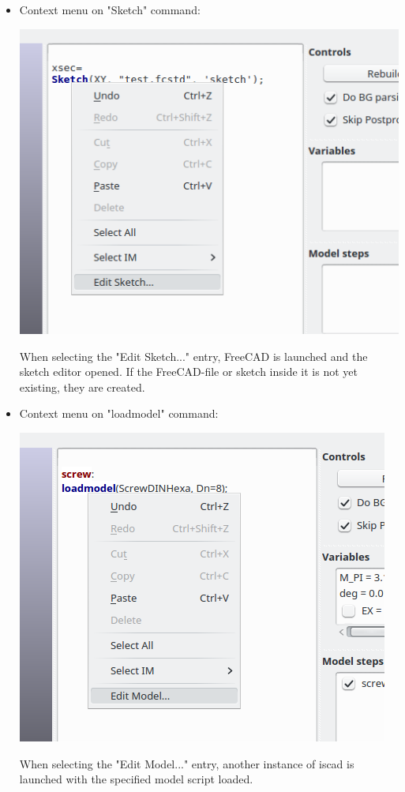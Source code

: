 \begin{itemize}
\item Context menu on "Sketch" command:

    \includegraphics[width=\linewidth]{figs/iscad/screenshot_iscad_context_sketch}
    
    When selecting the "Edit Sketch..." entry, FreeCAD is launched and
    the sketch editor opened. If the FreeCAD-file or sketch inside it is
    not yet existing, they are created.
\item Context menu on "loadmodel" command:

    \includegraphics[width=\linewidth]{figs/iscad/screenshot_iscad_context_loadmodel}
    
    When selecting the "Edit Model..." entry, another instance of iscad
    is launched with the specified model script loaded.
\end{itemize}
   
